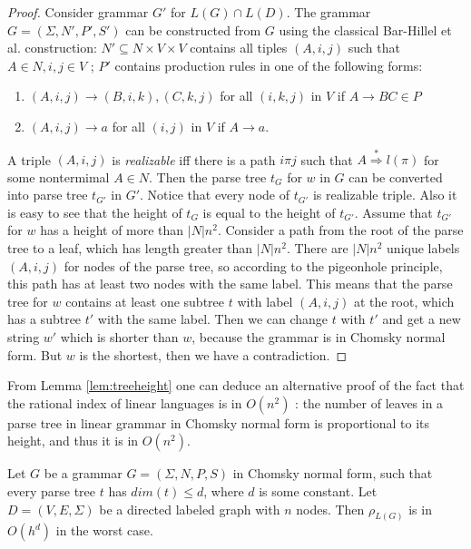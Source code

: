 \begin{proof}
Consider grammar $G'$ for $L(G)\cap L(D)$. The grammar $G = (\Sigma, N', P', S')$ can be constructed from $G$ using the classical Bar-Hillel et al. \cite{BarHillel} construction: $N' \subseteq N \times V \times V $  contains all tiples $(A, i, j)$ such that $A \in N, i, j \in V$ ; $P'$ contains production rules in one of the following forms:
\begin{enumerate}
\item $(A, i, j) \rightarrow (B, i, k), (C, k, j)$ for all $(i, k, j)$ in $V$  if $A \rightarrow BC \in P$
\item $(A, i, j) \rightarrow a$ for all $(i, j)$ in $V$ if $A \rightarrow a$.
\end{enumerate}
A triple $(A, i, j)$ is \textit{realizable} iff there is a path $i\pi j$ such that $A \stackrel {*}{\Rightarrow } l(\pi)$ for some nontermimal $A \in N$. Then the parse tree $t_G$ for $w$ in $G$ can be converted into parse tree $t_{G'}$ in $G'$. Notice that every node of $t_{G'}$ is realizable triple. Also it is easy to see that the height of $t_G$ is equal to the height of $t_{G'}$. Assume that $t_{G'}$ for $w$ has a height of more than $|N|n^2$. Consider a path from the root of the parse tree to a leaf, which has length greater than $|N|n^2$. There are $|N|n^2$ unique labels $(A, i, j)$ for nodes of the parse tree, so according to the pigeonhole principle, this path has at least two nodes with the same label. This means that the parse tree for $w$ contains at least one subtree $t$ with label $(A, i, j)$ at the root, which has a subtree $t'$ with the same label. Then we can change $t$ with $t'$ and get a new string $w'$ which is shorter than $w$, because the grammar is in Chomsky normal form. But $w$ is the shortest, then we have a contradiction.

\end{proof}
From Lemma \ref{lem:treeheight} one can deduce an alternative proof of the fact that the rational index of linear languages is in $O(n^2)$ \cite{RatBasic}: the number of leaves in a parse tree in linear grammar in Chomsky normal form is proportional to its height, and thus it is in $O(n^2)$.
\begin{lemma}
\label{oscbnddim}
Let $G$ be a grammar $G = (\Sigma, N, P, S)$ in Chomsky normal form, such that every parse tree $t$ has $dim(t) \le d$, where $d$ is some constant. Let $D=(V, E, \Sigma)$ be a directed labeled graph with $n$ nodes. Then $\rho_{L(G)}$ is in $O(h^d)$ in the worst case.
\end{lemma}

